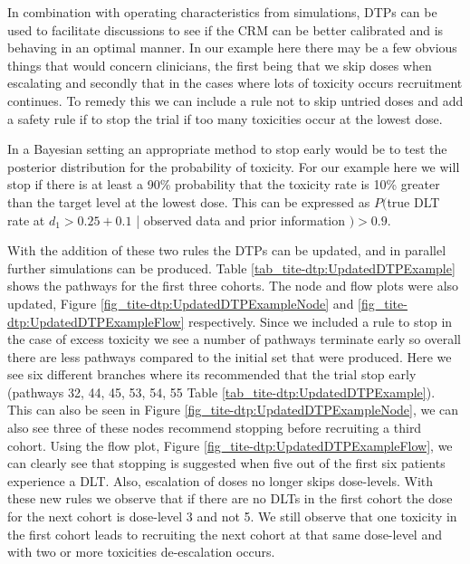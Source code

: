 In combination with operating characteristics from simulations, DTPs can be used to facilitate discussions to see if the CRM can be better calibrated and is behaving in an optimal manner. In our example here there may be a few obvious things that would concern clinicians, the first being that we skip doses when escalating and secondly that in the cases where lots of toxicity occurs recruitment continues. To remedy this we can include a rule not to skip untried doses and add a safety rule if to stop the trial if too many toxicities occur at the lowest dose. 

In a Bayesian setting an appropriate method to stop early would be to test the posterior distribution for the probability of toxicity. For our example here we will stop if there is at least a 90\% probability that the toxicity rate is 10\% greater than the target level at the lowest dose. This can be expressed as $P($true DLT rate at $d_1 > 0.25 + 0.1$ | observed data and prior information $) > 0.9$. 

With the addition of these two rules the DTPs can be updated, and in parallel further simulations can be produced. Table \ref{tab_tite-dtp:UpdatedDTPExample} shows the pathways for the first three cohorts. The node and flow plots were also updated, Figure \ref{fig_tite-dtp:UpdatedDTPExampleNode} and \ref{fig_tite-dtp:UpdatedDTPExampleFlow} respectively. Since we included a rule to stop in the case of excess toxicity we see a number of pathways terminate early so overall there are less pathways compared to the initial set that were produced. Here we see six different branches where its recommended that the trial stop early (pathways 32, 44, 45, 53, 54, 55 Table \ref{tab_tite-dtp:UpdatedDTPExample}). This can also be seen in Figure \ref{fig_tite-dtp:UpdatedDTPExampleNode}, we can also see three of these nodes recommend stopping before recruiting a third cohort. Using the flow plot, Figure \ref{fig_tite-dtp:UpdatedDTPExampleFlow}, we can clearly see that stopping is suggested when five out of the first six patients experience a DLT. Also, escalation of doses no longer skips dose-levels. With these new rules we observe that if there are no DLTs in the first cohort the dose for the next cohort is dose-level 3 and not 5. We still observe that one toxicity in the first cohort leads to recruiting the next cohort at that same dose-level and with two or more toxicities de-escalation occurs. 

